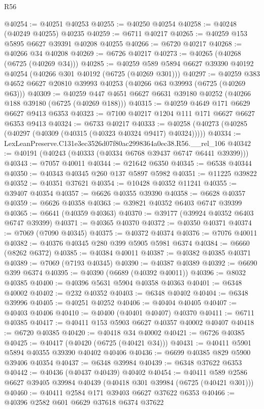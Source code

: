 \begin{lexlean}{R56}
\begin{coremodule}
@40254 := @40251 @40253
@40255 := @40250 @40254
@40258 := @40248 (@40249 @40255) @40235
@40259 := @6711 @40217
@40265 := @40259 @153 @5895 @6627 @39391 @40208 @40255
@40266 := @6720 @40217
@40268 := @40266 @34 @40208
@40269 := @6726 @40217
@40273 := @40265 (@40268 (@6725 (@40269 @34)))
@40285 := @40259 @589 @5894 @6627 @39390 @40192 @40254 (@40266 @301 @40192 (@6725 (@40269 @301)))
@40297 := @40259 @383 @4652 @6627 @20810 @39993 @40253 (@40266 @63 @39993 (@6725 (@40269 @63)))
@40309 := @40259 @447 @4651 @6627 @6631 @39180 @40252 (@40266 @188 @39180 (@6725 (@40269 @188)))
@40315 := @40259 @4649 @171 @6629 @6627 @9413 @6353
@40323 := @7100 @40217 @1204 @111 @171 @6627 @6627 @6353 @9413
@40324 := @6733 @40217
@40333 := @40258 (@40273 (@40285 (@40297 (@40309 (@40315 (@40323 @40324 @9417) @40324)))))
@40334 := LexLeanPreserve.C131e3ec3526d07f80ac2998364a0ec38.R56.__rel_106
@40342 := @40191 (@40243 (@40333 (@40334 @6768 @39437 @6747 @6441 @39399)))
@40343 := @7057 @40011
@40344 := @21642 @6350
@40345 := @6538 @40344
@40350 := @40343 @40345 @260 @137 @5897 @5982
@40351 := @11225 @39822
@40352 := @40351 @37621
@40354 := @10428 @40352 @11241
@40355 := @39407 @40354
@40357 := @6626 @40355 @39390
@40358 := @6628 @40357
@40359 := @6626 @40358
@40363 := @39821 @40352 @6403 @6747 @39399
@40365 := @6641 (@40359 @40363)
@40370 := @39177 (@39924 @40352 @6403 @6747 @39399)
@40371 := @40365 @40370
@40372 := @40350 @40371
@40374 := @7069 (@7090 @40345)
@40375 := @40372 @40374
@40376 := @7076 @40011
@40382 := @40376 @40345 @280 @399 @5905 @5981 @6374
@40384 := @6660 (@8262 @6372)
@40385 := @40384 @40011
@40387 := @40382 @40385 @40371
@40389 := @7069 (@7193 @40345)
@40390 := @40387 @40389
@40392 := @6690 @399 @6374
@40395 := @40390 (@6689 (@40392 @40011))
@40396 := @8032 @40385
@40400 := @40396 @5631 @5904 @40358 @40363
@40401 := @6348 @40002
@40402 := @232 @40352
@40403 := @6348 @40402
@40404 := @6348 @39996
@40405 := @40251 @40252
@40406 := @40404 @40405
@40407 := @40403 @40406
@40410 := @40400 (@40401 @40407) @40370
@40411 := @6711 @40385
@40417 := @40411 @153 @5903 @6627 @40357 @40002 @40407
@40418 := @6720 @40385
@40420 := @40418 @34 @40002
@40421 := @6726 @40385
@40425 := @40417 (@40420 (@6725 (@40421 @34)))
@40431 := @40411 @5901 @5894 @40355 @39390 @40402 @40406
@40436 := @6699 @40385 @829 @5900 @39406 @40354
@40437 := @6348 @39984
@40439 := @6348 @37622 @6353
@40442 := @40436 (@40437 @40439) @40402
@40454 := @40411 @589 @2586 @6627 @39405 @39984 @40439 (@40418 @301 @39984 (@6725 (@40421 @301)))
@40460 := @40411 @2584 @171 @39403 @6627 @37622 @6353
@40466 := @40396 @2582 @601 @6629 @37618 @6374 @37622

\end{coremodule}
\end{lexlean}
